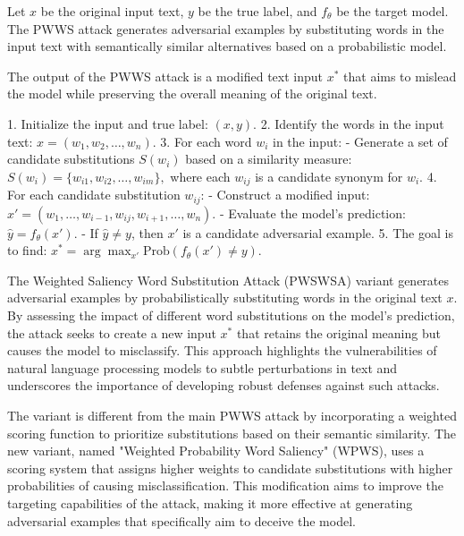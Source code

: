 Let \( x \) be the original input text, \( y \) be the true label, and \( f_{\theta} \) be the target model. The PWWS attack generates adversarial examples by substituting words in the input text with semantically similar alternatives based on a probabilistic model.

The output of the PWWS attack is a modified text input \( x^* \) that aims to mislead the model while preserving the overall meaning of the original text.

1. Initialize the input and true label:
   $
   (x, y).
   $
2. Identify the words in the input text:
   $
   x = (w_1, w_2, \ldots, w_n).
   $
3. For each word \( w_i \) in the input:
   - Generate a set of candidate substitutions \( S(w_i) \) based on a similarity measure:
   $
   S(w_i) = \{w_{i1}, w_{i2}, \ldots, w_{im}\},
   $
   where each \( w_{ij} \) is a candidate synonym for \( w_i \).
4. For each candidate substitution \( w_{ij} \):
   - Construct a modified input:
   $
   x' = (w_1, \ldots, w_{i-1}, w_{ij}, w_{i+1}, \ldots, w_n).
   $
   - Evaluate the model's prediction:
   $
   \hat{y} = f_{\theta}(x').
   $
   - If \( \hat{y} \neq y \), then \( x' \) is a candidate adversarial example.
5. The goal is to find:
   $
   x^* = \arg\max_{x'} \text{Prob}(f_{\theta}(x') \neq y).
   $

The  Weighted Saliency Word Substitution Attack (PWSWSA) variant generates adversarial examples by probabilistically substituting words in the original text \( x \). By assessing the impact of different word substitutions on the model's prediction, the attack seeks to create a new input \( x^* \) that retains the original meaning but causes the model to misclassify. This approach highlights the vulnerabilities of natural language processing models to subtle perturbations in text and underscores the importance of developing robust defenses against such attacks.

The variant is different from the main PWWS attack by incorporating a weighted scoring function to prioritize substitutions based on their semantic similarity. The new variant, named "Weighted Probability Word Saliency" (WPWS), uses a scoring system that assigns higher weights to candidate substitutions with higher probabilities of causing misclassification. This modification aims to improve the targeting capabilities of the attack, making it more effective at generating adversarial examples that specifically aim to deceive the model.